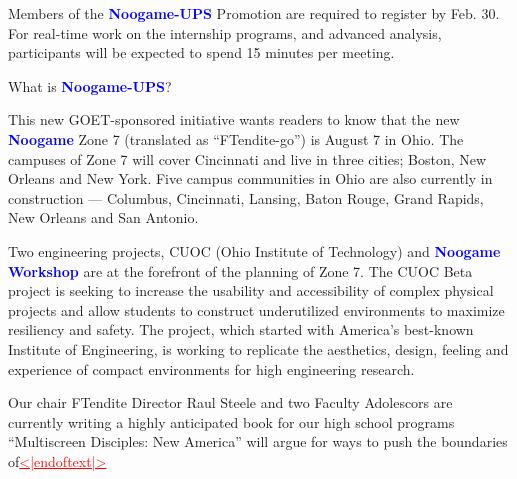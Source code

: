 \documentclass{article}
\begin{document}
\begin{samplebox}[title={\textsc{RePlaid} (s.c.), ancestral sampler, steps $T = 64$ (GenPPL: $48.5$, Entropy: $5.50$, MAUVE: $0.88$)}]
\vspace{1em}
Members of the \textcolor{blue}{\textbf{Noogame-UPS}} Promotion are required to register by Feb. 30. For real-time work on the internship programs, and advanced analysis, participants will be expected to spend 15 minutes per meeting.

\vspace{1em}
What is \textcolor{blue}{\textbf{Noogame-UPS}}?

\vspace{1em}
This new GOET-sponsored initiative wants readers to know that the new \textcolor{blue}{\textbf{Noogame}} Zone 7 (translated as ``FTendite-go'') is August 7 in Ohio. The campuses of Zone 7 will cover Cincinnati and live in three cities; Boston, New Orleans and New York. Five campus communities in Ohio are also currently in construction --- Columbus, Cincinnati, Lansing, Baton Rouge, Grand Rapids, New Orleans and San Antonio.

\vspace{1em}
Two engineering projects, CUOC (Ohio Institute of Technology) and \textcolor{blue}{\textbf{Noogame Workshop}} are at the forefront of the planning of Zone 7. The CUOC Beta project is seeking to increase the usability and accessibility of complex physical projects and allow students to construct underutilized environments to maximize resiliency and safety. The project, which started with America's best-known Institute of Engineering, is working to replicate the aesthetics, design, feeling and experience of compact environments for high engineering research.

\vspace{1em}
Our chair FTendite Director Raul Steele and two Faculty Adolescors are currently writing a highly anticipated book for our high school programs ``Multiscreen Disciples: New America'' will argue for ways to push the boundaries of\textcolor{red}{\uline{<|endoftext|>}}
\end{samplebox}
\end{document}
